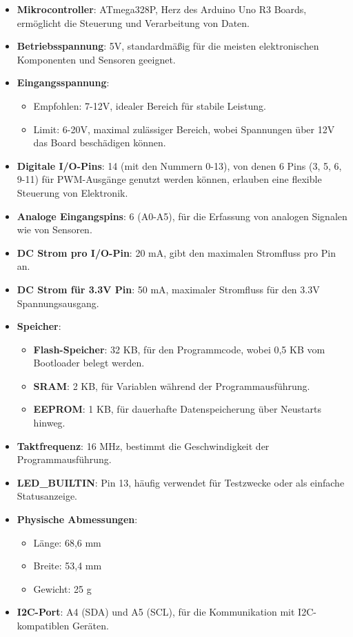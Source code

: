 \documentclass{vorlage-design-main}
\begin{document}
\begin{itemize}

\item
  \textbf{Mikrocontroller}: ATmega328P, Herz des Arduino Uno R3 Boards,
  ermöglicht die Steuerung und Verarbeitung von Daten.
\item
  \textbf{Betriebsspannung}: 5V, standardmäßig für die meisten
  elektronischen Komponenten und Sensoren geeignet.
\item
  \textbf{Eingangsspannung}:

  \begin{itemize}
  
  \item
    Empfohlen: 7-12V, idealer Bereich für stabile Leistung.
  \item
    Limit: 6-20V, maximal zulässiger Bereich, wobei Spannungen über 12V
    das Board beschädigen können.
  \end{itemize}
\item
  \textbf{Digitale I/O-Pins}: 14 (mit den Nummern 0-13), von denen 6
  Pins (3, 5, 6, 9-11) für PWM-Ausgänge genutzt werden können, erlauben
  eine flexible Steuerung von Elektronik.
\item
  \textbf{Analoge Eingangspins}: 6 (A0-A5), für die Erfassung von
  analogen Signalen wie von Sensoren.
\item
  \textbf{DC Strom pro I/O-Pin}: 20 mA, gibt den maximalen Stromfluss
  pro Pin an.
\item
  \textbf{DC Strom für 3.3V Pin}: 50 mA, maximaler Stromfluss für den
  3.3V Spannungsausgang.
\item
  \textbf{Speicher}:

  \begin{itemize}
  
  \item
    \textbf{Flash-Speicher}: 32 KB, für den Programmcode, wobei 0,5 KB
    vom Bootloader belegt werden.
  \item
    \textbf{SRAM}: 2 KB, für Variablen während der Programmausführung.
  \item
    \textbf{EEPROM}: 1 KB, für dauerhafte Datenspeicherung über
    Neustarts hinweg.
  \end{itemize}
\item
  \textbf{Taktfrequenz}: 16 MHz, bestimmt die Geschwindigkeit der
  Programmausführung.
\item
  \textbf{LED\_BUILTIN}: Pin 13, häufig verwendet für Testzwecke oder
  als einfache Statusanzeige.
\item
  \textbf{Physische Abmessungen}:

  \begin{itemize}
  
  \item
    Länge: 68,6 mm
  \item
    Breite: 53,4 mm
  \item
    Gewicht: 25 g
  \end{itemize}
\item
  \textbf{I2C-Port}: A4 (SDA) und A5 (SCL), für die Kommunikation mit
  I2C-kompatiblen Geräten.
\end{itemize}
\end{document}

